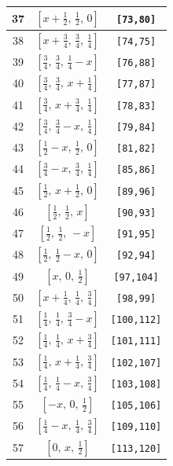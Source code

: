 \documentclass[fleqn,8pt]{jsarticle}
\begin{document}
\begin{longtable}{ccc}
37 & $\left[ x + \frac{1}{2},\, \frac{1}{2},\, 0 \right]$ & {\tt [73,80]} \\ \hline
38 & $\left[ x + \frac{3}{4},\, \frac{3}{4},\, \frac{1}{4} \right]$ & {\tt [74,75]} \\ \hline
39 & $\left[ \frac{3}{4},\, \frac{3}{4},\, \frac{1}{4} - x \right]$ & {\tt [76,88]} \\ \hline
40 & $\left[ \frac{3}{4},\, \frac{3}{4},\, x + \frac{1}{4} \right]$ & {\tt [77,87]} \\ \hline
41 & $\left[ \frac{3}{4},\, x + \frac{3}{4},\, \frac{1}{4} \right]$ & {\tt [78,83]} \\ \hline
42 & $\left[ \frac{3}{4},\, \frac{3}{4} - x,\, \frac{1}{4} \right]$ & {\tt [79,84]} \\ \hline
43 & $\left[ \frac{1}{2} - x,\, \frac{1}{2},\, 0 \right]$ & {\tt [81,82]} \\ \hline
44 & $\left[ \frac{3}{4} - x,\, \frac{3}{4},\, \frac{1}{4} \right]$ & {\tt [85,86]} \\ \hline
45 & $\left[ \frac{1}{2},\, x + \frac{1}{2},\, 0 \right]$ & {\tt [89,96]} \\ \hline
46 & $\left[ \frac{1}{2},\, \frac{1}{2},\, x \right]$ & {\tt [90,93]} \\ \hline
47 & $\left[ \frac{1}{2},\, \frac{1}{2},\, - x \right]$ & {\tt [91,95]} \\ \hline
48 & $\left[ \frac{1}{2},\, \frac{1}{2} - x,\, 0 \right]$ & {\tt [92,94]} \\ \hline
49 & $\left[ x,\, 0,\, \frac{1}{2} \right]$ & {\tt [97,104]} \\ \hline
50 & $\left[ x + \frac{1}{4},\, \frac{1}{4},\, \frac{3}{4} \right]$ & {\tt [98,99]} \\ \hline
51 & $\left[ \frac{1}{4},\, \frac{1}{4},\, \frac{3}{4} - x \right]$ & {\tt [100,112]} \\ \hline
52 & $\left[ \frac{1}{4},\, \frac{1}{4},\, x + \frac{3}{4} \right]$ & {\tt [101,111]} \\ \hline
53 & $\left[ \frac{1}{4},\, x + \frac{1}{4},\, \frac{3}{4} \right]$ & {\tt [102,107]} \\ \hline
54 & $\left[ \frac{1}{4},\, \frac{1}{4} - x,\, \frac{3}{4} \right]$ & {\tt [103,108]} \\ \hline
55 & $\left[ - x,\, 0,\, \frac{1}{2} \right]$ & {\tt [105,106]} \\ \hline
56 & $\left[ \frac{1}{4} - x,\, \frac{1}{4},\, \frac{3}{4} \right]$ & {\tt [109,110]} \\ \hline
57 & $\left[ 0,\, x,\, \frac{1}{2} \right]$ & {\tt [113,120]} \\ \hline

\end{longtable}
\end{document}

